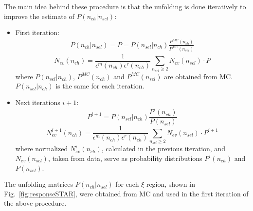  The main idea behind these procedure is that the unfolding  is done iteratively to improve the estimate of $P(n_{ch}|n_{sel})$:
\begin{itemize}
	\item First iteration: \\
	\begin{eqnarray}
	P(n_{ch}|n_{sel}) = P = P(n_{sel}|n_{ch})\frac{P^{MC}(n_{ch})}{P^{MC}(n_{sel})}
	\end{eqnarray}
	\begin{equation}
	N_{ev}(n_{ch})=\frac{1}{\epsilon^{m}(n_{ch})\epsilon^{r}(n_{ch})}\sum_{n_{sel}\geq2}N_{ev}(n_{sel})\cdot P
	\end{equation}
	where $P(n_{sel}|n_{ch})$, $P^{MC}(n_{ch})$ and $P^{MC}(n_{sel})$ are obtained from MC. $P(n_{sel}|n_{ch})$ is the same for each iteration.
	
	\item Next iterations $i+1$:
	\begin{equation}
	P^{i+1}=P(n_{sel}|n_{ch})\frac{P^{i}(n_{ch})}{P(n_{sel})}
	\end{equation}
	\begin{equation}
	N_{ev}^{i+1}(n_{ch})=\frac{1}{\epsilon^{m}(n_{ch})\epsilon^{r}(n_{ch})}\sum_{n_{sel}\geq2}N_{ev}(n_{sel})\cdot P^{i+1}
	\end{equation}
	where normalized $N_{ev}^i(n_{ch})$, calculated in the previous iteration, and $N_{ev}(n_{sel})$, taken from data, serve as probability distributions $P^{i}(n_{ch})$ and $P(n_{sel})$.
\end{itemize}

The  unfolding matrices $P(n_{ch}|n_{sel})$  for each $\xi$ region, shown in Fig.~\ref{fig:responseSTAR}, were obtained from MC and used in the first iteration of the above procedure. 

